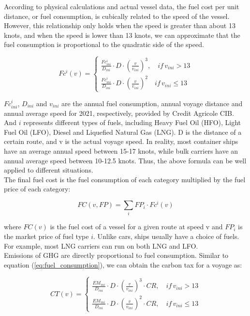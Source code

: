 \documentclass[a4paper,12pt]{article}
\begin{document}
According to physical calculations and actual vessel data, the fuel cost per unit distance, or fuel consumption, is cubically related to the speed of the vessel.
However, this relationship only holds when the speed is greater than about 13 knots, and when the speed is lower than 13 knots, we can approximate that the fuel consumption is proportional to the quadratic side of the speed.

\begin{equation}
	\label{eq:fuel_consumption}
	Fc^i(v) =
	\left\{
	\begin{aligned}
		\frac{Fc^i_{ini}}{D_{ini}} \cdot D \cdot (\frac{v}{v_{ini}})^3, \quad if \, v_{ini} > 13 \\
		\frac{Fc^i_{ini}}{D_{ini}} \cdot D \cdot (\frac{v}{v_{ini}})^2 \quad if \, v_{ini} \leq 13
	\end{aligned}
	\right.
\end{equation}

$Fc^i_{ini}$, $D_{ini}$ and $v_{ini}$ are the annual fuel consumption, annual voyage distance and annual average speed for 2021, respectively, provided by Credit Agricole CIB.
And $i$ represents different types of fuels, including Heavy Fuel Oil (HFO), Light Fuel Oil (LFO), Diesel and Liquefied Natural Gas (LNG). D is the distance of a certain route, and v is the actual voyage speed.
In reality, most container ships have an average annual speed between 15-17 knots, while bulk carriers have an annual average speed between 10-12.5 knots.
Thus, the above formula can be well applied to different situations.\\

The final fuel cost is the fuel consumption of each category multiplied by the fuel price of each category:

\begin{equation}
	\label{eq:fuel_cost}
	FC(v, FP) = \sum_i FP_i \cdot Fc^i(v)
\end{equation}

where $FC(v)$ is the fuel cost of a vessel for a given route at speed v and $FP_i$ is the market price of fuel type $i$. Unlike cars, ships usually have a choice of fuels. For example, most LNG carriers can run on both LNG and LFO.\\

Emissions of GHG are directly proportional to fuel consumption.
Similar to equation (\ref{eq:fuel_consumption}), we can obtain the carbon tax for a voyage as:

\begin{equation}
	\label{eq:emission}
	CT(v) =
	\left\{
	\begin{aligned}
		\frac{EM_{ini}}{D_{ini}} \cdot D \cdot (\frac{v}{v_{ini}})^3 \cdot CR, \quad if \, v_{ini} > 13 \\
		\frac{EM_{ini}}{D_{ini}} \cdot D \cdot (\frac{v}{v_{ini}})^2 \cdot CR, \quad if \, v_{ini} \leq 13
	\end{aligned}
	\right.
\end{equation}
\end{document}
